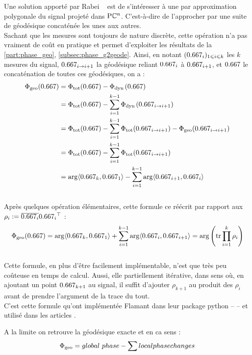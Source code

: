 Une solution apporté par Rabei \etal~\cite{rabei_bargmann_1999} est de s'intéresser à une par approximation polygonale du signal projeté dans $\text{\normalfont P}\mathbb{C}^{n}$. 
C'est-à-dire de l'approcher par une suite de géodésique concaténée les unes aux autres. 
\\
Sachant que les mesures sont toujours de nature discrète, cette opération n'a pas vraiment de coût en pratique et permet d'exploiter les résultats de la \cref{part:phase_geo}, \cref{subsec:phase_g2geode}. 
Ainsi, en notant $(\x_i)_{1\leq i\leq k}$ les $k$ mesures du signal, $\x_{i\rightarrow i+1}$ la géodésique reliant $\x_i$ à $\x_{i+1}$, et $\x$ le concaténation de toutes ces géodésiques, on a  :
\begin{align*}
\phaseg(\x) &= \phaset(\x) - \phased(\x) \\
	&= \phaset(\x) - \sum_{i=1}^{k-1} \phased(\x_{i\rightarrow i+1}) \\
	&= \phaset(\x) - \sum_{i=1}^{k-1} \phaset(\x_{i\rightarrow i+1}) - \phaseg(\x_{i\rightarrow i+1}) \\
	&= \phaset(\x) - \sum_{i=1}^{k-1} \phaset(\x_{i\rightarrow i+1}) \\
	&= \arg\langle\x_k, \x_1\rangle - \sum_{i=1}^{k-1} \arg\langle\x_{i+1}, \x_i\rangle
\end{align*} 
\\
Après quelques opération élémentaires, cette formule ce réécrit par rapport aux $\rho_i \defeq \congu{\x_i}\transp{\x_i}$ :
\begin{equation} \label{eq:bargmann}
	\phaseg(\x) = \arg\langle\x_k, \x_1\rangle + \sum_{i=1}^{k-1} \arg\langle\x_i, \x_{i+1}\rangle = \arg \left( \tr \prod_{i=1}^{k} \rho_i \right)
\end{equation}
\\
Cette formule, en plus d'être facilement implémentable, n'est que très peu coûteuse en temps de calcul. Aussi, elle partiellement itérative, dans sens où, en ajoutant un point $\x_{k+1}$ au signal, il suffit d'ajouter $\rho_{k+1}$ au produit des $\rho_i$ avant de prendre l'argument de la trace du tout.
\\

C'est cette formule qu'ont implémentée Flamant \etal dans leur package python  --  -- et utilisé dans les articles \cite{le_bihan_modephysiques_2023, le_bihan_geometric_2024}.
\\
\begin{remarque}
	A la limite on retrouve la géodésique exacte et en ca sens :\cite{sjoqvist_geometric_2015}
	\[\Phi_{\text{\normalfont geo}} = global\ phase - \sum local phase changes\]
\end{remarque}



